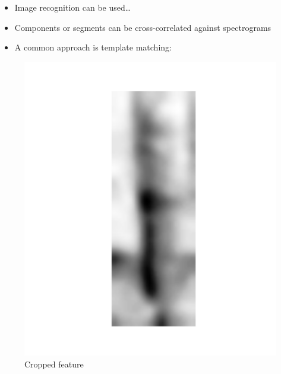 \documentclass[t, xcolor={dvipsnames}]{beamer}
\begin{document}
\begin{frame}[fragile]
  \vspace{0.5cm}
  \begin{addmargin}{0.5cm}
    \begin{itemize}
      \item Image recognition can be used\ldots
      \item Components or segments can be cross-correlated against spectrograms
      \item A common approach is template matching:
    \end{itemize}

  \end{addmargin}
    \begin{figure}[!tbp]
      \centering
      \begin{minipage}[c]{0.3\textwidth}
        \includegraphics[width=\textwidth]{img/selected-feature}\\
        {\tiny Cropped feature}
      \end{minipage}
      \hfill
      \begin{minipage}[c]{0.3\textwidth}

\end{minipage}
\end{figure}
\end{frame}
\end{document}
